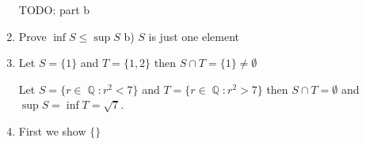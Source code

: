 \documentclass[10pt,a4paper]{article}
\DeclareMathOperator*{\Q}{\mathbb{Q}}
\begin{document}
\begin{enumerate}
        TODO: part b

    \item  Prove $ \inf S \leq \sup S $
        b) $S$ is just one element

    \item Let $S = \{ 1 \} $ and $T = \{1, 2\}$ then $S \cap T = \{ 1 \} \neq \emptyset$

        Let $S = \{ r \in \Q : r^2 < 7 \} $ and $T = \{ r \in \Q : r^2 > 7 \}$ then $S \cap T = \emptyset$ and $\sup S = \inf T = \sqrt7$.

    \item First we show $\{ \}$

\end{enumerate}
\end{document}
